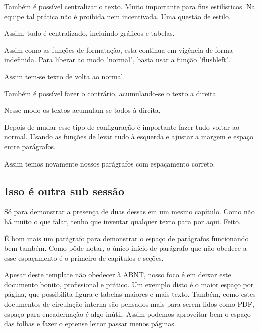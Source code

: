 \centering 
Também é possível centralizar o texto. Muito importante para fins estilísticos. Na equipe tal prática não é proibida nem incentivada. Uma questão de estilo.

Assim, tudo é centralizado, incluindo gráficos e tabelas.

Assim como as funções de formatação, esta continua em vigência de forma indefinida. Para liberar ao modo "normal", basta usar a função "flushleft".

\flushleft

Assim tem-se texto de volta ao normal.

\flushright 

Também é possível fazer o contrário, acumulando-se o texto a direita.

Nesse modo os textos acumulam-se todos à direita.

\flushleft                                                                %
\setlength\parindent{3ex}                                                 %
\setlength{\parskip}{0.25em}                                              %

Depois de mudar esse tipo de configuração é importante fazer tudo voltar ao normal. Usando as funções de levar tudo à esquerda e ajustar a margem e espaço entre parágrafos.

Assim temos novamente nossos parágrafos com espaçamento correto.

\subsection{Isso é outra sub sessão} 

Só para demonstrar a presença de duas dessas em um mesmo capítulo. Como não há muito o que falar, tenho que inventar qualquer texto para por aqui. Feito.

É bom mais um parágrafo para demonstrar o espaço de parágrafos funcionando bem também. Como pôde notar, o único início de parágrafo que não obedece a esse espaçamento é o primeiro de capítulos e seções. 

Apesar deste template não obedecer à ABNT, nosso foco é em deixar este documento bonito, profissional e prático. Um exemplo disto é o maior espaço por página, que possibilita figura e tabelas maiores e mais texto. Também, como estes documentos de circulação interna são pensados mais para serem lidos como PDF, espaço para encadernação é algo inútil. Assim podemos aproveitar bem o espaço das folhas e fazer o eptense leitor passar menos páginas.

